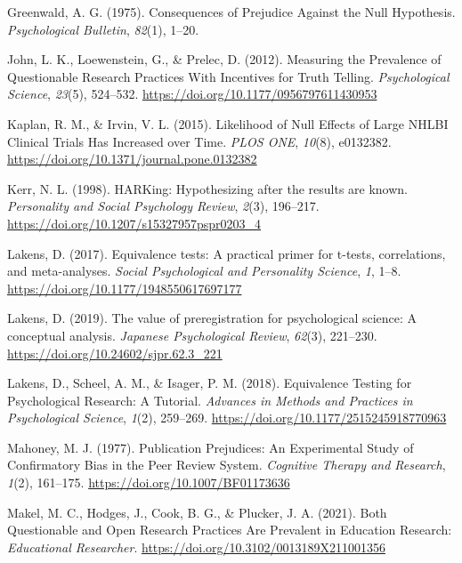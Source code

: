 \documentclass[british,,jou,floatsintext]{apa6}
\begin{document}
\leavevmode\hypertarget{ref-Greenwald1975}{}%
Greenwald, A. G. (1975). Consequences of Prejudice Against the Null Hypothesis. \emph{Psychological Bulletin}, \emph{82}(1), 1--20.

\leavevmode\hypertarget{ref-John2012}{}%
John, L. K., Loewenstein, G., \& Prelec, D. (2012). Measuring the Prevalence of Questionable Research Practices With Incentives for Truth Telling. \emph{Psychological Science}, \emph{23}(5), 524--532. \url{https://doi.org/10.1177/0956797611430953}

\leavevmode\hypertarget{ref-Kaplan2015}{}%
Kaplan, R. M., \& Irvin, V. L. (2015). Likelihood of Null Effects of Large NHLBI Clinical Trials Has Increased over Time. \emph{PLOS ONE}, \emph{10}(8), e0132382. \url{https://doi.org/10.1371/journal.pone.0132382}

\leavevmode\hypertarget{ref-Kerr1998}{}%
Kerr, N. L. (1998). HARKing: Hypothesizing after the results are known. \emph{Personality and Social Psychology Review}, \emph{2}(3), 196--217. \url{https://doi.org/10.1207/s15327957pspr0203_4}

\leavevmode\hypertarget{ref-R-TOSTER}{}%
Lakens, D. (2017). Equivalence tests: A practical primer for t-tests, correlations, and meta-analyses. \emph{Social Psychological and Personality Science}, \emph{1}, 1--8. \url{https://doi.org/10.1177/1948550617697177}

\leavevmode\hypertarget{ref-Lakens2019}{}%
Lakens, D. (2019). The value of preregistration for psychological science: A conceptual analysis. \emph{Japanese Psychological Review}, \emph{62}(3), 221--230. \url{https://doi.org/10.24602/sjpr.62.3_221}

\leavevmode\hypertarget{ref-Lakens2018a}{}%
Lakens, D., Scheel, A. M., \& Isager, P. M. (2018). Equivalence Testing for Psychological Research: A Tutorial. \emph{Advances in Methods and Practices in Psychological Science}, \emph{1}(2), 259--269. \url{https://doi.org/10.1177/2515245918770963}

\leavevmode\hypertarget{ref-Mahoney1977}{}%
Mahoney, M. J. (1977). Publication Prejudices: An Experimental Study of Confirmatory Bias in the Peer Review System. \emph{Cognitive Therapy and Research}, \emph{1}(2), 161--175. \url{https://doi.org/10.1007/BF01173636}

\leavevmode\hypertarget{ref-Makel2021}{}%
Makel, M. C., Hodges, J., Cook, B. G., \& Plucker, J. A. (2021). Both Questionable and Open Research Practices Are Prevalent in Education Research: \emph{Educational Researcher}. \url{https://doi.org/10.3102/0013189X211001356}
\end{document}
